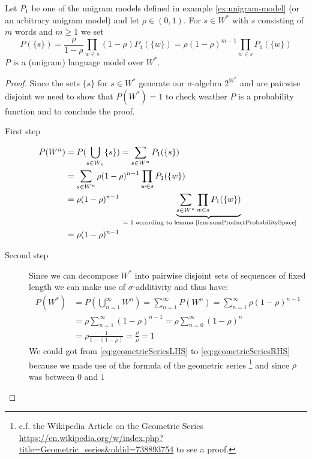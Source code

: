 \documentclass[•]{book}
\begin{document}
\begin{theorem}\label{thm:unigram-lm}
Let $P_1$ be one of the unigram models defined in example \ref{ex:unigram-model} (or an arbitrary unigram model) and let $\rho \in (0,1)$.
For $s\in W^{*}$ with $s$ consisting of $m$ words and $m\geq 1$ we set
\begin{equation}
P(\{s\}) = \frac{\rho}{1-\rho}\prod_{w\in s}(1-\rho)P_1(\{w\}) =  \rho(1-\rho)^{m-1}\prod_{w\in s}P_1(\{w\})
\end{equation}
$P$ is a (unigram) language model over $W^{*}$.
\begin{proof}
Since the sets $\{s\}$ for $s\in W^{*}$ generate our $\sigma$-algebra $2^{W^{*}}$ and are pairwise disjoint we need to show that $P(W^{*})=1$ to check weather $P$ is a probability function and to conclude the proof.

\begin{description}
\item[First step] 
\begin{align}
P(W^n) & = P(\bigcup_{s\in W_n} \{s\}) = \sum_{s\in W^n}P_1(\{s\}) \\
 & = \sum_{s\in W^n}\rho(1-\rho)^{n-1}\prod_{w\in s}P_1(\{w\}) \\
 & = \rho(1-\rho)^{n-1} \underbrace{\sum_{s\in W^n}\prod_{w\in s}P_1(\{w\})}_{\text{ = 1 according to lemma \ref{lem:sumProductProbabilitySpace}}} \\
 & = \rho(1-\rho)^{n-1}
\end{align}

\item[Second step] Since we can decompose $W^{*}$ into pairwise disjoint sets of sequences of fixed length we can make use of $\sigma$-additivity and thus have: 
\begin{align}
P(W^{*}) & = P(\bigcup_{n=1}^\infty W^n) = \sum_{n=1}^\infty P(W^n) = \sum_{n=1}^\infty \rho(1-\rho)^{n-1} \\
 & =  \rho \sum_{n=1}^\infty(1-\rho)^{n-1} = \rho \sum_{n=0}^\infty(1-\rho)^{n} \label{eq:geometricSeriesLHS} \\
 &  = \rho \frac{1}{1-(1-\rho)} = \frac{\rho}{\rho} = 1 \label{eq:geometricSeriesRHS}
\end{align}
We could got from \ref{eq:geometricSeriesLHS} to \ref{eq:geometricSeriesRHS} because we made use of the formula of the geometric series \footnote{c.f. the Wikipedia Article on the Geometric Series \url{https://en.wikipedia.org/w/index.php?title=Geometric_series&oldid=738893754} to see a proof. } and since $\rho$ was between $0$ and $1$
\end{description} 
\end{proof}
\end{theorem}
\end{document}
